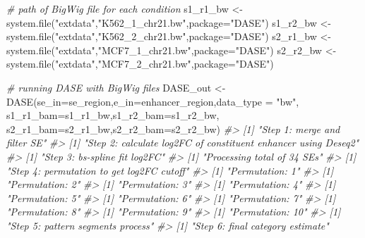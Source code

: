 \documentclass[
]{article}
\newenvironment{Shaded}{\begin{snugshade}}{\end{snugshade}}
\newcommand{\AttributeTok}[1]{\textcolor[rgb]{0.77,0.63,0.00}{#1}}
\newcommand{\CommentTok}[1]{\textcolor[rgb]{0.56,0.35,0.01}{\textit{#1}}}
\newcommand{\FunctionTok}[1]{\textcolor[rgb]{0.00,0.00,0.00}{#1}}
\newcommand{\NormalTok}[1]{#1}
\newcommand{\OtherTok}[1]{\textcolor[rgb]{0.56,0.35,0.01}{#1}}
\newcommand{\StringTok}[1]{\textcolor[rgb]{0.31,0.60,0.02}{#1}}
\begin{document}
\begin{Shaded}
\begin{Highlighting}[]
\CommentTok{\# path of BigWig file for each condition}
\NormalTok{s1\_r1\_bw }\OtherTok{\textless{}{-}} \FunctionTok{system.file}\NormalTok{(}\StringTok{"extdata"}\NormalTok{,}\StringTok{"K562\_1\_chr21.bw"}\NormalTok{,}\AttributeTok{package=}\StringTok{"DASE"}\NormalTok{)}
\NormalTok{s1\_r2\_bw }\OtherTok{\textless{}{-}} \FunctionTok{system.file}\NormalTok{(}\StringTok{"extdata"}\NormalTok{,}\StringTok{"K562\_2\_chr21.bw"}\NormalTok{,}\AttributeTok{package=}\StringTok{"DASE"}\NormalTok{)}
\NormalTok{s2\_r1\_bw }\OtherTok{\textless{}{-}} \FunctionTok{system.file}\NormalTok{(}\StringTok{"extdata"}\NormalTok{,}\StringTok{"MCF7\_1\_chr21.bw"}\NormalTok{,}\AttributeTok{package=}\StringTok{"DASE"}\NormalTok{)}
\NormalTok{s2\_r2\_bw }\OtherTok{\textless{}{-}} \FunctionTok{system.file}\NormalTok{(}\StringTok{"extdata"}\NormalTok{,}\StringTok{"MCF7\_2\_chr21.bw"}\NormalTok{,}\AttributeTok{package=}\StringTok{"DASE"}\NormalTok{)}

\CommentTok{\# running DASE with BigWig files}
\NormalTok{DASE\_out }\OtherTok{\textless{}{-}} \FunctionTok{DASE}\NormalTok{(}\AttributeTok{se\_in=}\NormalTok{se\_region,}\AttributeTok{e\_in=}\NormalTok{enhancer\_region,}\AttributeTok{data\_type =} \StringTok{"bw"}\NormalTok{,}
                 \AttributeTok{s1\_r1\_bam=}\NormalTok{s1\_r1\_bw,}\AttributeTok{s1\_r2\_bam=}\NormalTok{s1\_r2\_bw,}
                 \AttributeTok{s2\_r1\_bam=}\NormalTok{s2\_r1\_bw,}\AttributeTok{s2\_r2\_bam=}\NormalTok{s2\_r2\_bw)}
\CommentTok{\#\textgreater{} [1] "Step 1: merge and filter SE"}
\CommentTok{\#\textgreater{} [1] "Step 2: calculate log2FC of constituent enhancer using Deseq2"}
\CommentTok{\#\textgreater{} [1] "Step 3: bs{-}spline fit log2FC"}
\CommentTok{\#\textgreater{} [1] "Processing total of 34 SEs"}
\CommentTok{\#\textgreater{} [1] "Step 4: permutation to get log2FC cutoff"}
\CommentTok{\#\textgreater{} [1] "Permutation: 1"}
\CommentTok{\#\textgreater{} [1] "Permutation: 2"}
\CommentTok{\#\textgreater{} [1] "Permutation: 3"}
\CommentTok{\#\textgreater{} [1] "Permutation: 4"}
\CommentTok{\#\textgreater{} [1] "Permutation: 5"}
\CommentTok{\#\textgreater{} [1] "Permutation: 6"}
\CommentTok{\#\textgreater{} [1] "Permutation: 7"}
\CommentTok{\#\textgreater{} [1] "Permutation: 8"}
\CommentTok{\#\textgreater{} [1] "Permutation: 9"}
\CommentTok{\#\textgreater{} [1] "Permutation: 10"}
\CommentTok{\#\textgreater{} [1] "Step 5: pattern segments process"}
\CommentTok{\#\textgreater{} [1] "Step 6: final category estimate"}
\end{Highlighting}
\end{Shaded}
\end{document}
